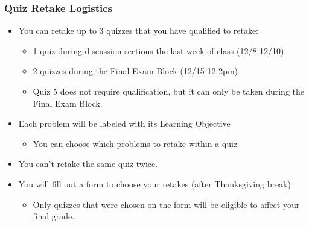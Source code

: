 \begin{frame}
\frametitle{Quiz Retake Logistics}
\begin{itemize}
    \item You can retake up to 3 quizzes that you have qualified to retake: 
    \begin{itemize}
        \item 1 quiz during discussion sections the last week of class (12/8-12/10)
        \item 2 quizzes during the Final Exam Block (12/15 12-2pm)
        \item Quiz 5 does not require qualification, but it can only be taken during the Final Exam Block.
    \end{itemize}\pause
    \item Each problem will be labeled with its Learning Objective
    \begin{itemize}
        \item You can choose which problems to retake within a quiz
    \end{itemize}\pause
    \item You can't retake the same quiz twice.\pause
    \item You will fill out a form to choose your retakes (after Thanksgiving break)
    \begin{itemize}
        \item Only quizzes that were chosen on the form will be eligible to affect your final grade.
    \end{itemize}
\end{itemize}
\end{frame}

